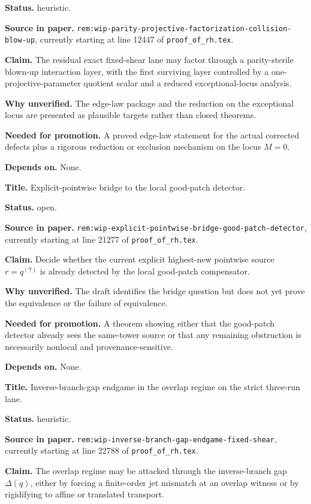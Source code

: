 \documentclass[11pt,a4paper]{amsart}
\begin{document}
\begin{description}[style=nextline,leftmargin=2.9cm,font=\normalfont\bfseries]
\textbf{Status.} heuristic.

\textbf{Source in paper.}
\texttt{rem:wip-parity-projective-factorization-collision-blow-up}, currently
starting at line 12447 of \texttt{proof\_of\_rh.tex}.

\textbf{Claim.} The residual exact fixed-shear lane may factor through a
parity-sterile blown-up interaction layer, with the first surviving layer
controlled by a one-projective-parameter quotient scalar and a reduced
exceptional-locus analysis.

\textbf{Why unverified.} The edge-law package and the reduction on the
exceptional locus are presented as plausible targets rather than closed
theorems.

\textbf{Needed for promotion.} A proved edge-law statement for the actual
corrected defects plus a rigorous reduction or exclusion mechanism on the locus
$M=0$.

\textbf{Depends on.} None.

\item[UV-004]
\textbf{Title.} Explicit-pointwise bridge to the local good-patch detector.

\textbf{Status.} open.

\textbf{Source in paper.}
\texttt{rem:wip-explicit-pointwise-bridge-good-patch-detector}, currently
starting at line 21277 of \texttt{proof\_of\_rh.tex}.

\textbf{Claim.} Decide whether the current explicit highest-new pointwise source
$r=q^{(7)}$ is already detected by the local good-patch compensator.

\textbf{Why unverified.} The draft identifies the bridge question but does not
yet prove the equivalence or the failure of equivalence.

\textbf{Needed for promotion.} A theorem showing either that the good-patch
detector already sees the same-tower source or that any remaining obstruction is
necessarily nonlocal and provenance-sensitive.

\textbf{Depends on.} None.

\item[UV-005]
\textbf{Title.} Inverse-branch-gap endgame in the overlap regime on the strict
three-run lane.

\textbf{Status.} heuristic.

\textbf{Source in paper.}
\texttt{rem:wip-inverse-branch-gap-endgame-fixed-shear}, currently starting at
line 22788 of \texttt{proof\_of\_rh.tex}.

\textbf{Claim.} The overlap regime may be attacked through the inverse-branch
gap $\Delta(q)$, either by forcing a finite-order jet mismatch at an overlap
witness or by rigidifying to affine or translated transport.


\end{description}
\end{document}
